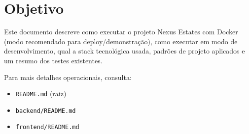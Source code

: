 \section{Objetivo}
Este documento descreve como executar o projeto Nexus Estates com Docker (modo recomendado para deploy/demonstração), como executar em modo de desenvolvimento, qual a stack tecnológica usada, padrões de projeto aplicados e um resumo dos testes existentes.

Para mais detalhes operacionais, consulta:
\begin{itemize}[nosep]
  \item \texttt{README.md} (raiz)
  \item \texttt{backend/README.md}
  \item \texttt{frontend/README.md}
\end{itemize}